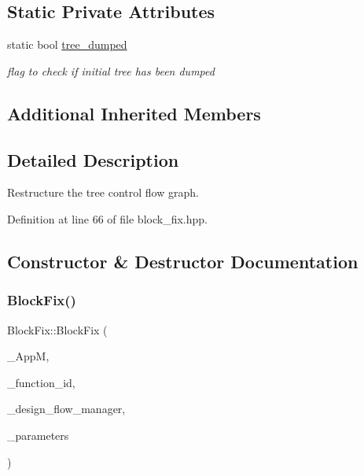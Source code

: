 \subsection*{Static Private Attributes}
\begin{DoxyCompactItemize}
\item 
static bool \hyperlink{classBlockFix_abca4a2fb59e4737db086e411859c6a14}{tree\+\_\+dumped}
\begin{DoxyCompactList}\small\item\em flag to check if initial tree has been dumped \end{DoxyCompactList}\end{DoxyCompactItemize}
\subsection*{Additional Inherited Members}


\subsection{Detailed Description}
Restructure the tree control flow graph. 

Definition at line 66 of file block\+\_\+fix.\+hpp.



\subsection{Constructor \& Destructor Documentation}
\mbox{\label{classBlockFix_a14c8bc0af2765839a0435791817aa8b0}} 
\subsubsection{\texorpdfstring{Block\+Fix()}{BlockFix()}}
{\footnotesize\ttfamily Block\+Fix\+::\+Block\+Fix (\begin{DoxyParamCaption}\item[{const \hyperlink{application__manager_8hpp_a04ccad4e5ee401e8934306672082c180}{application\+\_\+manager\+Ref}}]{\+\_\+\+AppM,  }\item[{unsigned int}]{\+\_\+function\+\_\+id,  }\item[{const Design\+Flow\+Manager\+Const\+Ref}]{\+\_\+design\+\_\+flow\+\_\+manager,  }\item[{const \hyperlink{Parameter_8hpp_a37841774a6fcb479b597fdf8955eb4ea}{Parameter\+Const\+Ref}}]{\+\_\+parameters }\end{DoxyParamCaption})}



